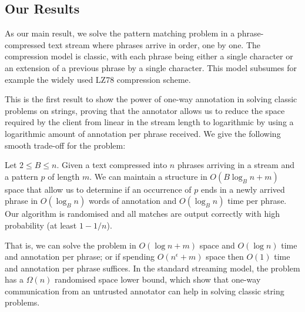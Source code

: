 \subsection{Our Results}
As our main result, we solve the pattern matching problem in a phrase-compressed text stream where phrases arrive in order, one by one. The compression model is classic, with each phrase being either a single character or an extension of a previous phrase by a single character. This model subsumes for example the widely used LZ78 compression scheme.


This is the first result to show the power of one-way annotation in solving classic problems on strings, proving that the annotator allows us to reduce the space required by the client from linear in the stream length to logarithmic by using a logarithmic amount of annotation per phrase received. We give the following smooth trade-off for the problem:

\begin{theorem}\label{thm:crossphrase78}
    
    Let $2 \leq B \leq n$.  Given a text compressed into $n$ phrases arriving in a stream and a pattern $p$ of length $m$. 
    We can maintain a structure in $O(B \log_B n + m)$ space that allow us to determine if an occurrence of $p$ ends in a newly arrived phrase in $O(\log_B n)$ words of annotation and $O(\log_B n)$ time per phrase. 
    Our algorithm is randomised and all matches are output correctly with high probability (at least $1-1/n$). 
    
    
\end{theorem}

That is, we can solve the problem in $O(\log n + m)$ space and $O(\log n)$ time and annotation per phrase; or if spending $O(n^\epsilon + m)$ space then $O(1)$ time and annotation per phrase suffices. In the standard streaming model, the problem has a $\Omega(n)$ randomised space lower bound, which show that one-way communication from an untrusted annotator can help in solving classic string problems.


